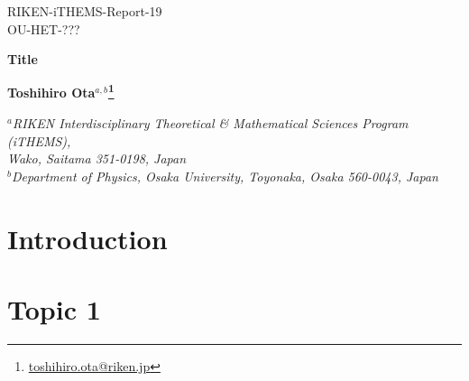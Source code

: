 \documentclass[11pt]{article}
\numberwithin{equation}{section}
\begin{document}



\renewcommand{\thefootnote}{\fnsymbol{footnote}}
\setcounter{page}{0}
\thispagestyle{empty}
\begin{flushright} %
RIKEN-iTHEMS-Report-19 \\
OU-HET-??? 
\end{flushright} 

\vskip3cm
\begin{center}
{\LARGE {\bf Title}}  %
\vskip1.5cm
{\large 
\bf {Toshihiro Ota$^{a, b}$\footnote{\href{mailto:toshihiro.ota@riken.jp}{toshihiro.ota@riken.jp}}
}  %

\vskip1cm
\it ${}^{a}$RIKEN Interdisciplinary Theoretical \& Mathematical Sciences Program (iTHEMS), \\
Wako, Saitama 351-0198, Japan \\ %
\it ${}^{b}$Department of Physics, Osaka University,  Toyonaka, Osaka 560-0043, Japan} 
\end{center}

\vskip1cm
\begin{abstract} %
\end{abstract}



\renewcommand{\thefootnote}{\arabic{footnote}}
\setcounter{footnote}{0}



\vfill\eject

\tableofcontents




\section{Introduction}




\section{Topic 1}
\end{document}
